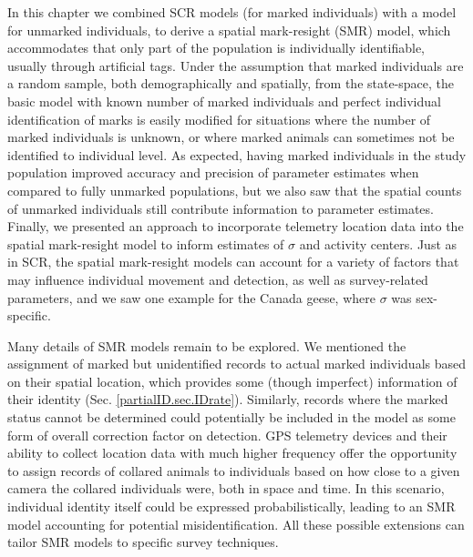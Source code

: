 In this chapter we combined SCR models (for marked individuals) with a
model for unmarked individuals,
to derive a spatial mark-resight (SMR) model, which
accommodates that only part of the population is individually identifiable,
usually through artificial tags. Under the assumption that marked
individuals are a random sample, both demographically and spatially,
from the state-space, the basic model with known number of marked
individuals and perfect individual identification of marks
is easily
modified for situations where the number of marked individuals is
unknown, or where marked animals can sometimes not be identified to
individual level. As expected, having marked individuals in the study
population improved accuracy and precision of parameter estimates when
compared to fully unmarked populations, but we also saw that the
spatial counts of unmarked individuals still contribute information to
parameter estimates. Finally, we presented an approach to
incorporate telemetry location data into the spatial mark-resight
model to inform estimates of $\sigma$ and activity centers. Just as in
SCR, the spatial mark-resight models can account for a variety of
factors that may influence individual movement and detection, as well
as survey-related parameters, and we saw one example for the Canada
geese, where $\sigma$ was sex-specific.

Many details of SMR models remain to be explored. We mentioned the
assignment of marked but unidentified records to actual marked
individuals based on their spatial location, which provides some
(though imperfect) information of their identity
(Sec. \ref{partialID.sec.IDrate}). Similarly, records where the marked
status cannot be determined could potentially be included in the model
as some form of overall correction factor on detection. GPS telemetry
devices and their ability to collect location data with much higher
frequency offer the opportunity to assign records of collared animals
to individuals based on how close to a given camera the collared
individuals were, both in space and time. In this scenario, individual
identity itself could be expressed probabilistically, leading to an
SMR model accounting for potential misidentification. All these
possible extensions can tailor SMR models to specific survey
techniques.

